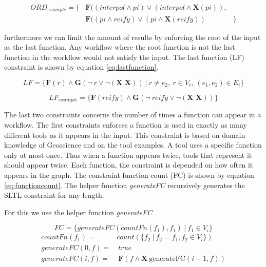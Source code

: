 \documentclass{article}
\begin{document}
\begin{align*}
    ORD_{example} = \{ & \textbf{F}((interpol \wedge pi) \vee (interpol \wedge \textbf{X} (pi)  ), \\
    &\textbf{F}((pi \wedge reify) \vee (pi \wedge \textbf{X} (reify)  ) &
    \}  
\end{align*}

furthermore we can limit the amount of results by enforcing the root of the input as the last function. Any workflow where the root function is not the last function in the workflow would not satisfy the input. The last function (LF) constraint is shown by equation \ref{eq:lastfunction}. 


\begin{equation}
    LF = \{ \textbf{F} (r) \wedge \textbf{G} ( \neg\ r \vee \neg (\textbf{X X})) \ |\ r \not = e_2,\ r \in V_i,\ (e_1, e_2) \in E_i \}
    \label{eq:lastfunction}
\end{equation}

\begin{equation*}
    LF_{example} = \{ \textbf{F} (reify) \wedge \textbf{G} ( \neg\ reify \vee \neg (\textbf{X X})) \}
\end{equation*}

The last two constraints concerns the number of times a function can appear in a workflow. The first constraints enforces a function is used in exactly as many different tools as it appears in the input. This constraint is based on domain knowledge of Geoscience and on the tool examples. A tool uses a specific function only at most once. Thus when a function appears twice, tools that represent it should appear twice. Each function, the constraint is depended on how often it appears in the graph. The constraint function count (FC) is shown by equation \ref{eq:functioncount}. The helper function \textit{ generateFC} recursively generates the SLTL constraint for any length. 

For this we use the helper function \textit{generateFC} 

\begin{equation}
    FC = \{   generateFC(countFn(f_1), f_1)\ |\ f_1 \in V_i\} \label{eq:functioncount}
\end{equation}
\begin{align*} 
countFn(f_1) =& count(\{ f_2\ |\ f_2 = f_1, f_2 \in V_i \})\\
    generateFC(0,f) =&\ true \\
    generateFC(i,f) =&\ \textbf{F}(f \wedge \textbf{X}\ \text{generateFC}(i-1,f))
\end{align*}
\end{document}
